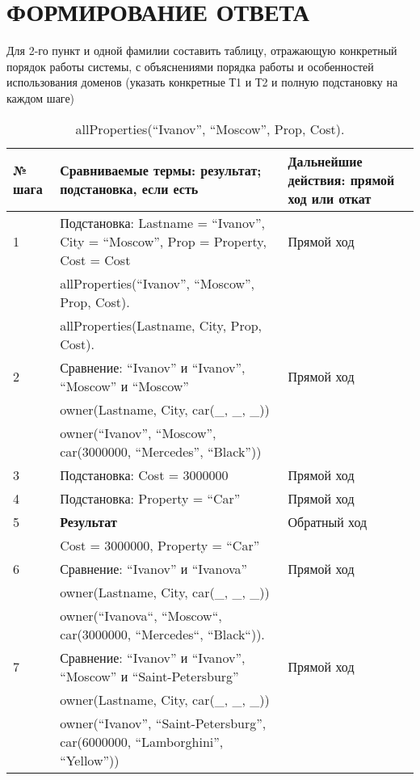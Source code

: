 \section{ФОРМИРОВАНИЕ ОТВЕТА}

Для 2-го пункт и одной фамилии составить таблицу, отражающую конкретный порядок работы системы, с объяснениями порядка работы и особенностей использования доменов (указать конкретные Т1 и Т2 и полную подстановку на каждом шаге)

{
\small
\begin{longtable}{|p{1.15cm}|p{8cm}|p{8cm}|}
    \caption{allProperties(``Ivanov'', ``Moscow'', Prop, Cost).} \\
    \hline
    № шага & Сравниваемые термы: результат; подстановка, если есть & Дальнейшие действия: прямой ход или откат \\
    \hline
    1 & Подстановка: Lastname = ``Ivanov'', City = ``Moscow'', Prop = Property, Cost = Cost & Прямой ход \\
      & allProperties(``Ivanov'', ``Moscow'', Prop, Cost). & \\
      & allProperties(Lastname, City, Prop, Cost). & \\
    \hline
    2 & Сравнение: ``Ivanov'' и ``Ivanov'', ``Moscow'' и ``Moscow'' & Прямой ход \\
      & owner(Lastname, City, car(\_, \_, \_)) & \\
      & owner(``Ivanov'', ``Moscow'', car(3000000, ``Mercedes'', ``Black'')) & \\
    \hline
    3 & Подстановка: Cost = 3000000 & Прямой ход \\
    \hline
    4 & Подстановка: Property = ``Car'' & Прямой ход \\
    \hline
    5 & \textbf{Результат} & Обратный ход \\
      & Cost = 3000000, Property = ``Car'' & \\
    \hline
    6 & Сравнение: ``Ivanov'' и ``Ivanova'' & Прямой ход \\
      & owner(Lastname, City, car(\_, \_, \_)) & \\
      & owner(``Ivanova``, ``Moscow``, car(3000000, ``Mercedes``, ``Black``)). & \\
    \hline
    7 & Сравнение: ``Ivanov'' и ``Ivanov'', ``Moscow'' и ``Saint-Petersburg'' & Прямой ход \\
      & owner(Lastname, City, car(\_, \_, \_)) & \\
      & owner(``Ivanov'', ``Saint-Petersburg'', car(6000000, ``Lamborghini'', ``Yellow'')) & \\

\end{longtable}}
